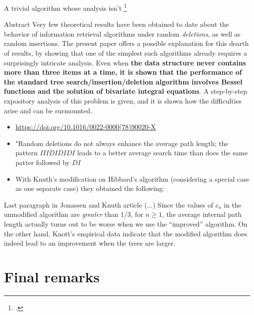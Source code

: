 \documentclass{beamer}
\begin{document}
\begin{frame}{A trivial algorithm whose analysis isn't \footcite{jonassen1978trivial}}
    \begin{block}{Abstract}
        Very few theoretical results have been obtained to date about the behavior of information retrieval algorithms under random \textit{deletions}, as well as random insertions. The present paper offers a possible explanation for this dearth of results, by showing that one of the simplest such algorithms already requires a surprisingly intricate analysis. Even when \textbf{the data structure never contains more than three items at a time, it is shown that the performance of the standard tree search/insertion/deletion algorithm involves Bessel functions and the solution of bivariate integral equations}. A step-by-step expository analysis of this problem is given, and it is shown how the difficulties arise and can be surmounted.
    \end{block}
\end{frame}

\begin{frame}
    \begin{itemize}
        \item \url{https://doi.org/10.1016/0022-0000(78)90020-X}
            \pause
        \item "Random deletions do not always enhance the average path length; the pattern $IIIDIDIDI$ leads to a better average search time than does the same patter followed by $DI$
            \pause
        \item With Knuth's modification on Hibbard's algorithm (considering a special case as one separate case) they obtained the following:
    \end{itemize}
    \begin{block}{Last paragraph in Jonassen and Knuth article}
        (...) Since the values of $c_n$ in the unmodified algorithm are \textit{greater} than $1/3$, for $n \geq 1$, the average internal path length actually turns out to be worse when we use the ``improved'' algorithm. On the other hand, Knott's empirical data indicate that the modified algorithm does indeed lead to an improvement when the trees are larger.
    \end{block}
\end{frame}


\section{Final remarks}
\end{document}
